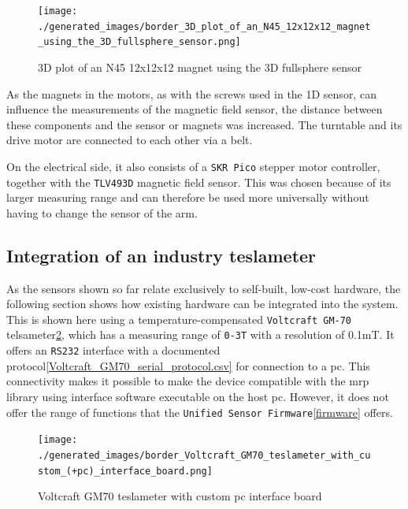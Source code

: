 \begin{figure}
\centering
\texttt{[image: ./generated\_images/border\_3D\_plot\_of\_an\_N45\_12x12x12\_magnet\_using\_the\_3D\_fullsphere\_sensor.png]}
\caption{3D plot of an N45 12x12x12 magnet using the 3D fullsphere
sensor
\label{3D_plot_of_an_N45_12x12x12_magnet_using_the_3D_fullsphere_sensor.png}}
\end{figure}

As the magnets in the motors, as with the screws used in the 1D sensor,
can influence the measurements of the magnetic field sensor, the
distance between these components and the sensor or magnets was
increased. The turntable and its drive motor are connected to each other
via a belt.

On the electrical side, it also consists of a
\passthrough{\lstinline!SKR Pico!} stepper motor controller, together
with the \passthrough{\lstinline!TLV493D!} magnetic field sensor. This
was chosen because of its larger measuring range and can therefore be
used more universally without having to change the sensor of the arm.

\hypertarget{integration-of-an-industry-teslameter}{%
\subsection{Integration of an industry
teslameter}\label{integration-of-an-industry-teslameter}}

As the sensors shown so far relate exclusively to self-built, low-cost
hardware, the following section shows how existing hardware can be
integrated into the system. This is shown here using a
temperature-compensated \passthrough{\lstinline!Voltcraft GM-70!}
telsameter\ref{Voltcraft_GM70_teslameter_with_custom_(+pc)_interface_board.png},
which has a measuring range of \passthrough{\lstinline!0-3T!} with a
resolution of 0.1mT. It offers an \passthrough{\lstinline!RS232!}
interface with a documented
protocol\ref{Voltcraft_GM70_serial_protocol.csv} for connection to a
\gls{pc}. This connectivity makes it possible to make the device
compatible with the \gls{mrp} library using interface software
\cite{VoltcraftGM70Rest} executable on the host \gls{pc}. However,
it does not offer the range of functions that the
\passthrough{\lstinline!Unified Sensor Firmware!}\ref{firmware} offers.

\begin{figure}
\centering
\texttt{[image: ./generated\_images/border\_Voltcraft\_GM70\_teslameter\_with\_custom\_(+pc)\_interface\_board.png]}
\caption{Voltcraft GM70 teslameter with custom \gls{pc} interface board
\label{Voltcraft_GM70_teslameter_with_custom_(+pc)_interface_board.png}}
\end{figure}

